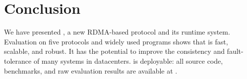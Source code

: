 \section{Conclusion}\label{sec:conclusion}

We have presented \xxx, a new RDMA-based \paxos protocol and its runtime 
system. Evaluation on five \paxos protocols and widely used programs 
shows that \xxx is fast, scalable, and robust. It has the potential to improve 
the consistency and fault-tolerance of many systems in datacenters. \xxx is 
deployable: all source code, benchmarks, and raw evaluation results are 
available at \github.
